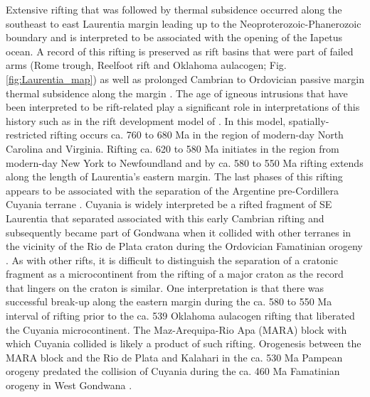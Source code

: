 \documentclass[11pt,letterpaper]{article}
\begin{document}
Extensive rifting that was followed by thermal subsidence occurred along the southeast to east Laurentia margin leading up to the Neoproterozoic-Phanerozoic boundary and is interpreted to be associated with the opening of the Iapetus ocean. A record of this rifting is preserved as rift basins that were part of failed arms (Rome trough, Reelfoot rift and Oklahoma aulacogen; Fig. \ref{fig:Laurentia_map}) as well as prolonged Cambrian to Ordovician passive margin thermal subsidence along the margin \citep{Bond1984a, Whitmeyer2007a}. The age of igneous intrusions that have been interpreted to be rift-related play a significant role in interpretations of this history such as in the rift development model of \citet{Burton2010a}. In this model, spatially-restricted rifting occurs ca. 760 to 680 Ma in the region of modern-day North Carolina and Virginia. Rifting ca. 620 to 580 Ma initiates in the region from modern-day New York to Newfoundland and by ca. 580 to 550 Ma rifting extends along the length of Laurentia's eastern margin. The last phases of this rifting appears to be associated with the separation of the Argentine pre-Cordillera Cuyania terrane \citep{Dickerson1998a}. Cuyania is widely interpreted be a rifted fragment of SE Laurentia that separated associated with this early Cambrian rifting and subsequently became part of Gondwana when it collided with other terranes in the vicinity of the Rio de Plata craton during the Ordovician Famatinian orogeny \citep{Martin2019a}. As with other rifts, it is difficult to distinguish the separation of a cratonic fragment as a microcontinent from the rifting of a major craton as the record that lingers on the craton is similar. One interpretation is that there was successful break-up along the eastern margin during the ca. 580 to 550 Ma interval of rifting prior to the ca. 539 Oklahoma aulacogen rifting that liberated the Cuyania microcontinent. The Maz-Arequipa-Rio Apa (MARA) block with which Cuyania collided \citep{Martin2019a} is likely a product of such rifting. Orogenesis between the MARA block and the Rio de Plata and Kalahari in the ca. 530 Ma Pampean orogeny \citep{Casquet2018a} predated the collision of Cuyania during the ca. 460 Ma Famatinian orogeny in West Gondwana \citep{Rapalini2018a}. 
\end{document}
